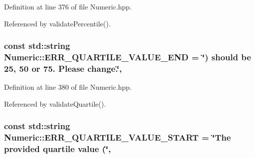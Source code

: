 Definition at line 376 of file Numeric.\-hpp.



Referenced by validate\-Percentile().

\hypertarget{classmultiscale_1_1Numeric_ac63a2d1c105ab47208d6c40827f9769c}{
\subsubsection[{E\-R\-R\-\_\-\-Q\-U\-A\-R\-T\-I\-L\-E\-\_\-\-V\-A\-L\-U\-E\-\_\-\-E\-N\-D}]{\setlength{\rightskip}{0pt plus 5cm}const std\-::string Numeric\-::\-E\-R\-R\-\_\-\-Q\-U\-A\-R\-T\-I\-L\-E\-\_\-\-V\-A\-L\-U\-E\-\_\-\-E\-N\-D = \char`\"{}) should be 25, 50 or 75. Please change.\char`\"{}\hspace{0.3cm}{\ttfamily [static]}, {\ttfamily [private]}}}\label{classmultiscale_1_1Numeric_ac63a2d1c105ab47208d6c40827f9769c}


Definition at line 380 of file Numeric.\-hpp.



Referenced by validate\-Quartile().

\hypertarget{classmultiscale_1_1Numeric_ac76a6a6f1fa8abae2855f4fed0f0d97e}{
\subsubsection[{E\-R\-R\-\_\-\-Q\-U\-A\-R\-T\-I\-L\-E\-\_\-\-V\-A\-L\-U\-E\-\_\-\-S\-T\-A\-R\-T}]{\setlength{\rightskip}{0pt plus 5cm}const std\-::string Numeric\-::\-E\-R\-R\-\_\-\-Q\-U\-A\-R\-T\-I\-L\-E\-\_\-\-V\-A\-L\-U\-E\-\_\-\-S\-T\-A\-R\-T = \char`\"{}The provided {\bf quartile} value (\char`\"{}\hspace{0.3cm}{\ttfamily [static]}, {\ttfamily [private]}}}\label{classmultiscale_1_1Numeric_ac76a6a6f1fa8abae2855f4fed0f0d97e}


